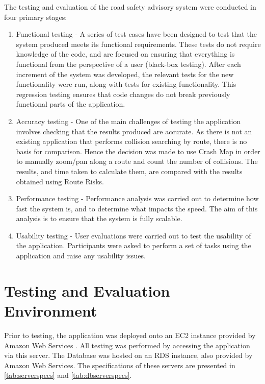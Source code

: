 \documentclass[authoryearcitations]{UoYCSproject}
\begin{document}
The testing and evaluation of the road safety advisory system were conducted in four primary stages:

\begin{enumerate}
	\item Functional testing - A series of test cases have been designed to test that the system produced meets its functional requirements. These tests do not require knowledge of the code, and are focused on ensuring that everything is functional from the perspective of a user (black-box testing). After each increment of the system was developed, the relevant tests for the new functionality were run, along with tests for existing functionality. This regression testing ensures that code changes do not break previously functional parts of the application.
	\item Accuracy testing - One of the main challenges of testing the application involves checking that the results produced are accurate. As there is not an existing application that performs collision searching by route, there is no basis for comparison. Hence the decision was made to use Crash Map \citep{crashmap} in order to manually zoom/pan along a route and count the number of collisions. The results, and time taken to calculate them, are compared with the results obtained using Route Risks.
	\item Performance testing -  Performance analysis was carried out to determine how fast the system is, and to determine what impacts the speed. The aim of this analysis is to ensure that the system is fully scalable. 
	\item Usability testing - User evaluations were carried out to test the usability of the application. Participants were asked to perform a set of tasks using the application and raise any usability issues.
\end{enumerate}

\section{Testing and Evaluation Environment}

Prior to testing, the application was deployed onto an EC2 instance provided by Amazon Web Services \citep{AmazonWebServices}. All testing was performed by accessing the application via this server. The Database was hosted on an RDS instance, also provided by Amazon Web Services. The specifications of these servers are presented in \autoref{tab:serverspecs} and \autoref{tab:dbserverspecs}.
\end{document}
